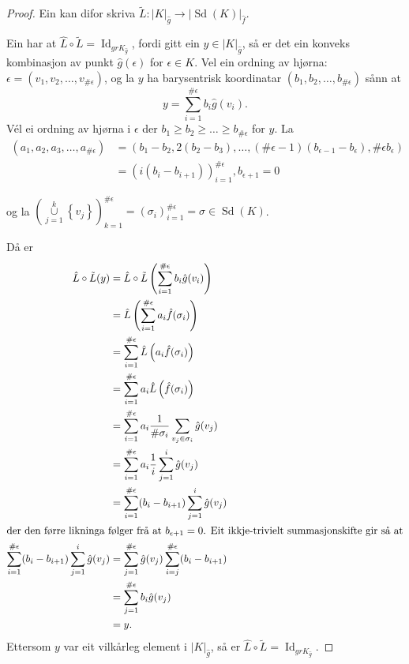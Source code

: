 \documentclass[a4paper, 12pt, norsk]{article}
\theoremstyle{plain}
\theoremstyle{definition}
\newcommand{\union}{ \mathop{\cup}\limits }
\newcommand{\gr}[1]{ \lvert #1 \rvert } %
\newcommand{\set}[1]{ \left\{ #1 \right\} } %
\newcommand{\tuple}[1]{ \left( #1 \right) } %
\DeclareMathOperator{\Sd}{Sd} %
\DeclareMathOperator{\Id}{Id} %
\begin{document}
\begin{proof}
	Ein kan difor skriva \( \tilde{L}: \gr{K}_{\hat{g}} \to \gr{\Sd(K)}_{\hat{f}} \).

	Ein har at \( \hat{L}\circ\tilde{L} = \Id_{gr{K}_{\hat{g}}} \), fordi gitt ein \( y \in \gr{K}_{\hat{g}} \), så er det ein konveks kombinasjon av punkt \( \hat{g}(\epsilon) \) for \( \epsilon \in K \). Vel ein ordning av hjørna: \( \epsilon = (v_1, v_2, \dots, v_{\#\epsilon}) \), og la \( y \) ha barysentrisk koordinatar \( (b_1, b_2, \dots, b_{\#\epsilon}) \) sånn at
	\[
		y = \sum_{i = 1}^{\#\epsilon} b_i \hat{g}(v_i).
	\]
	Vél ei ordning av hjørna i \( \epsilon \) der \( b_1 \geq b_2 \geq \dots \geq b_{\#\epsilon} \) for \( y \). La 
	\begin{align*}
		(a_1, a_2, a_3, \dots, a_{\#\epsilon}) &= \left( b_1-b_2, 2(b_2-b_3), \dots, (\#\epsilon-1)(b_{\epsilon-1}-b_{\epsilon}), \#\epsilon b_{\epsilon} \right) \\
		&= \left( i (b_i-b_{i+1}) \right)_{i=1}^{\#\epsilon}, b_{\epsilon+1} = 0
	\end{align*}
		
	og la \( \left(\union_{j = 1}^{k} \set{v_j} \right)_{k=1}^{\#\epsilon} = (\sigma_i)_{i=1}^{\#\epsilon}=\sigma \in \Sd(K) \).

	Då er
	\begin{align*} %
		\hat{L}\circ\tilde{L}(y) &= \hat{L}\circ\tilde{L}\tuple{\sum_{i=1}^{\#\epsilon} b_i \hat{g}(v_i)} \\
		&= \hat{L}\left( \sum_{i=1}^{\#\epsilon} a_i \hat{f}(\sigma_i) \right) \\
		&= \sum_{i=1}^{\#\epsilon} \hat{L} \left( a_i \hat{f}(\sigma_i) \right) \\
		&= \sum_{i=1}^{\#\epsilon} a_i \hat{L} \left( \hat{f}(\sigma_i) \right) \\
		&= \sum_{i=1}^{\#\epsilon} a_i \frac{1}{\#\sigma_i} \sum_{v_j \in \sigma_i} \hat{g}(v_j) \\
		&= \sum_{i=1}^{\#\epsilon} a_i \frac{1}{i} \sum_{j = 1}^{i} \hat{g}(v_j) \\
		&= \sum_{i=1}^{\#\epsilon} (b_{i}-b_{i+1}) \sum_{j = 1}^{i} \hat{g}(v_j) \\
		\intertext{der den førre likninga følger frå at \( b_{\epsilon+1} = 0 \). Eit ikkje-trivielt summasjonskifte gir så at}
		\sum_{i=1}^{\#\epsilon} (b_{i}-b_{i+1}) \sum_{j = 1}^{i} \hat{g}(v_j) &= \sum_{j=1}^{\#\epsilon} \hat{g}(v_j) \sum_{i = j}^{\#\epsilon} (b_{i}-b_{i+1}) \\
		&= \sum_{j=1}^{\#\epsilon} b_i \hat{g}(v_j) \\
		&= y.
	\end{align*}
	Ettersom \( y \) var eit vilkårleg element i \( \gr{K}_{\hat{g}} \), så er \( \hat{L}\circ\tilde{L} = \Id_{gr{K}_{\hat{g}}} \).


\end{proof}
\end{document}
